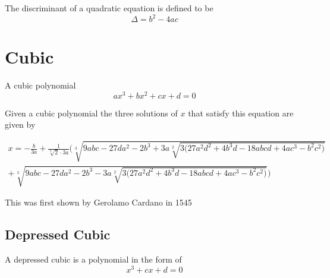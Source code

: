 \documentclass[a4paper]{article}
\begin{document}
The discriminant of a quadratic equation is defined to be 
\begin{equation}
\Delta = b^2 - 4ac
\end{equation}

\section{Cubic}

\begin{definition}\label{cubic def}
A cubic polynomial 
$$
ax^3 + bx^2 + cx + d = 0
$$
\end{definition}

Given a cubic polynomial the three solutions of $x$ that satisfy this equation are given by 

\begin{equation} \label{cubic solution}
\boxed{
\begin{split}
x = - \frac{b}{3a} +
\frac{1}{\sqrt[3]{2} \cdot 3 a} \Bigg(
 \sqrt[3]{9abc - 27 d a^2 - 2 b^3  + 3a \sqrt[2]{
3 \Big( 
27 a^2 d^2 + 4 b^3 d - 18 abcd + 4 a c^3 - b^2 c^2
\Big)
}} 
\\
+
\sqrt[3]{9abc - 27 d a^2 - 2 b^3 - 
3a \sqrt[2]{
3
\Big( 
27 a^2 d^2 + 4 b^3 d - 18 abcd + 4 a c^3 - b^2 c^2
\Big)
}}
\Bigg)
\end{split}
}
\end{equation}

This was first shown by Gerolamo Cardano in 1545

\subsection{Depressed Cubic}
\begin{definition}\label{depressed cubic def}
A depressed cubic is a polynomial in the form of
$$
x^3 + cx + d = 0
$$
\end{definition}
\end{document}
